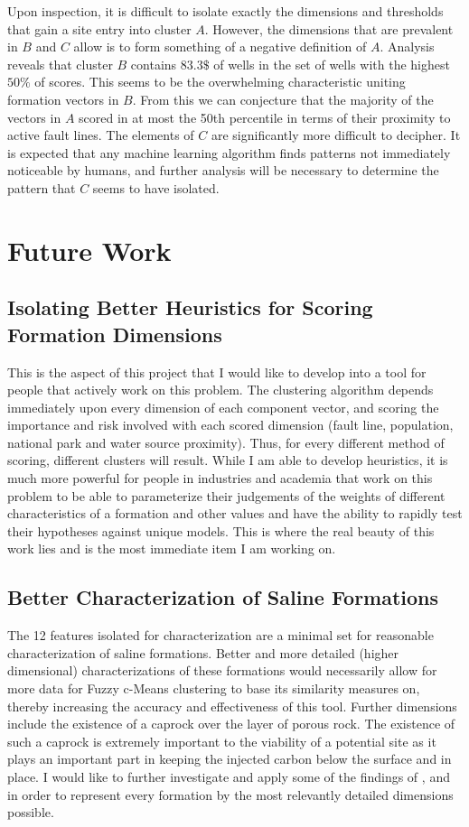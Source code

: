\documentclass[letterpaper, 12pt]{article}
\begin{document}
\par Upon inspection, it is difficult to isolate exactly the dimensions and thresholds that gain a site entry into cluster $A$. However, the dimensions that are prevalent in $B$ and $C$ allow is to form something of a negative definition of $A$. Analysis reveals that cluster $B$ contains $83.3\$$ of wells in the set of wells with the highest $50\%$ of scores. This seems to be the overwhelming characteristic uniting formation vectors in $B$. From this we can conjecture that the majority of the vectors in $A$ scored in at most the 50th percentile in terms of their proximity to active fault lines. The elements of $C$ are significantly more difficult to decipher. It is expected that any machine learning algorithm finds patterns not immediately noticeable by humans, and further analysis will be necessary to determine the pattern that $C$ seems to have isolated. 

\section{Future Work}
\subsection{Isolating Better Heuristics for Scoring Formation Dimensions}
This is the aspect of this project that I would like to develop into a tool for people that actively work on this problem. The clustering algorithm depends immediately upon every dimension of each component vector, and scoring the importance and risk involved with each scored dimension (fault line, population, national park and water source proximity). Thus, for every different method of scoring, different clusters will result. While I am able to develop heuristics, it is much more powerful for people in industries and academia that work on this problem to be able to parameterize their judgements of the weights of different characteristics of a formation and other values and have the ability to rapidly test their hypotheses against unique models. This is where the real beauty of this work lies and is the most immediate item I am working on. 

\subsection{Better Characterization of Saline Formations}\label{betterchar}
The 12 features isolated for characterization are a minimal set for reasonable characterization of saline formations. Better and more detailed (higher dimensional) characterizations of these formations would necessarily allow for more data for Fuzzy c-Means clustering to base its similarity measures on, thereby increasing the accuracy and effectiveness of this tool. Further dimensions include the existence of a caprock over the layer of porous rock. The existence of such a caprock is extremely important to the viability of a potential site as it plays an important part in keeping the injected carbon below the surface and in place. I would like to further investigate and apply some of the findings of \cite{atlas}, \cite{natcarb_risk} and \cite{PredRisk2013} in order to represent every formation by the most relevantly detailed dimensions possible. 
\end{document}
